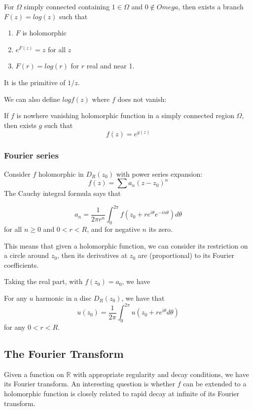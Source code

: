\documentclass[main.tex]{subfiles}
\begin{document}
\begin{theorem}
For $\Omega$ simply connected containing $1 \in \Omega$ and $0 \nin Omega$, then exists a branch $F(z) = log(z)$ such that
\begin{enumerate}
    \item $F$ is holomorphic
    \item $e^{F(z)} = z$ for all $z$
    \item $F(r) = log(r)$ for $r$ real and near 1.
\end{enumerate}
\end{theorem}
It is the primitive of $1/z$.

We can also define $log f(z)$ where $f$ does not vanish:

\begin{theorem}
If $f$ is nowhere vanishing holomorphic function in a simply connected region $\Omega$, then exists $g$ such that 
$$
f(z) = e^{g(z)}
$$
\end{theorem}

\subsubsection{Fourier series}
Consider $f$ holomorphic in $D_R(z_0)$ with power series expansion:
$$
f(z) = \sum a_n(z-z_0)^n
$$
The Cauchy integral formula says that
\begin{theorem}
$$
a_n = \frac{1}{2\pi r^n} \int_0 ^{2\pi} f(z_0 + r e^{i\theta} e^{-in\theta}) d\theta
$$
for all $n \geq 0$ and $0 < r < R$, and for negative $n$ its zero. 
\end{theorem}

This means that given a holomorphic function, we can consider its restriction on a circle around $z_0$, then its derivatives at $z_0$ are (proportional) to its Fourier coefficients.

Taking the real part, with $f(z_0) = a_0$, we have 
\begin{corollary}
For any $u$ harmonic in a disc $D_R(z_0)$, we have that 
$$
u(z_0) = \frac{1}{2\pi}\int_0 ^{2\pi} u(z_0 + re^{i \theta} d\theta)
$$
for any $0 < r < R$.
\end{corollary}

\subsection{The Fourier Transform}
Given a function on $\mathbb{R}$ with appropriate regularity and decay conditions, we have its Fourier transform. An interesting question is whether $f$ can be extended to a holomorphic function is closely related to rapid decay at infinite of its Fourier transform.
\end{document}

